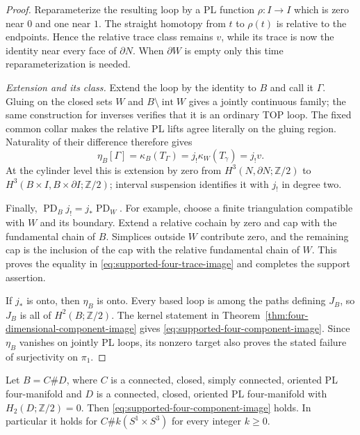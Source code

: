 \begin{proof}
Reparameterize the resulting loop by a PL function
$\rho:I\to I$ which is zero near $0$ and one near $1$.
The straight homotopy from $t$ to $\rho(t)$ is relative
to the endpoints. Hence the relative trace class remains
$v$, while its trace is now the identity near every face
of $\partial N$. When $\partial W$ is empty only this
time reparameterization is needed.

\emph{Extension and its class.}
Extend the loop by the identity to $B$ and call it $\Gamma$.
Gluing on the closed sets $W$ and $B\setminus\operatorname{int}W$
gives a jointly continuous family; the same construction
for inverses verifies that it is an ordinary TOP loop.
The fixed common collar makes the relative PL lifts agree
literally on the gluing region. Naturality of their difference
therefore gives
\begin{equation}\label{eq:supported-four-extension-zero}
 \eta_B[\Gamma]=\kappa_B(T_\Gamma)
                              =j_!\kappa_W(T_\gamma)=j_!v.
\end{equation}
At the cylinder level this is extension by zero from
$H^3(N,\partial N;\mathbb Z/2)$ to
$H^3(B\times I,B\times\partial I;\mathbb Z/2)$;
interval suspension identifies it with $j_!$ in degree two.

Finally,
$\operatorname{PD}_B j_!=j_*\operatorname{PD}_W$.
For example, choose a finite triangulation compatible with
$W$ and its boundary. Extend a relative cochain by zero
and cap with the fundamental chain of $B$. Simplices outside
$W$ contribute zero, and the remaining cap is the inclusion
of the cap with the relative fundamental chain of $W$.
This proves the equality in
\eqref{eq:supported-four-trace-image} and completes the
support assertion.

If $j_*$ is onto, then $\eta_B$ is onto. Every based loop
is among the paths defining $J_B$, so $J_B$ is all of
$H^2(B;\mathbb Z/2)$. The kernel statement in
Theorem~\ref{thm:four-dimensional-component-image} gives
\eqref{eq:supported-four-component-image}. Since $\eta_B$
vanishes on jointly PL loops, its nonzero target also proves
the stated failure of surjectivity on $\pi_1$.
\end{proof}

\begin{corollary}\label{cor:connected-sum-supported-traces}
Let $B=C\#D$, where $C$ is a connected, closed, simply
connected, oriented PL four-manifold and $D$ is a connected,
closed, oriented PL four-manifold with
$H_2(D;\mathbb Z/2)=0$. Then
\eqref{eq:supported-four-component-image} holds.
In particular it holds for $C\#k(S^1\times S^3)$ for every
integer $k\ge0$.
\end{corollary}

